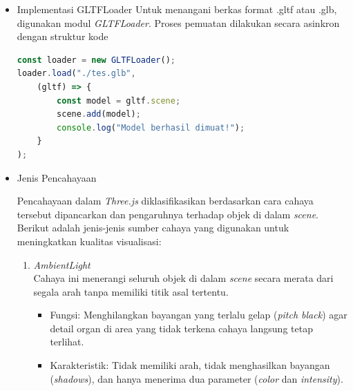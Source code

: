 \documentclass[a4paper,twoside]{article}
\begin{document}
\begin{enumerate}
\begin{itemize}
                    Proses integrasi aset visual ke dalam sistem dilakukan dengan memuat model eksternal menggunakan \textit{loader} spesifik. Berdasarkan standar dokumentasi \textit{Three.\-js} \footnote{\url{https://threejs.org/manual/#en/loading-3d-models} (diakses pada 1 April 2026)}, format yang paling disarankan untuk keperluan web adalah \textit{GLTF} (\textit{Graphics Language Transmission Format}) karena efisiensinya dalam pengiriman data melalui jaringan.
            
                \item{Implementasi GLTFLoader}
                    Untuk menangani berkas format .gltf atau .glb, digunakan modul \textit{GLTFLoader}. Proses pemuatan dilakukan secara asinkron dengan struktur kode 
                    
                    \begin{lstlisting}[language=JavaScript, caption={Implementasi Pemuatan Model GLTF}]
const loader = new GLTFLoader();
loader.load("./tes.glb", 
    (gltf) => {
        const model = gltf.scene;
        scene.add(model);
        console.log("Model berhasil dimuat!");
    }
);
                    \end{lstlisting}
                    
                \item{Jenis Pencahayaan}
                 \label{subsec:jenis_cahaya}
            
                    Pencahayaan dalam \textit{Three.js} diklasifikasikan berdasarkan cara cahaya tersebut dipancarkan dan pengaruhnya terhadap objek di dalam \textit{scene}. Berikut adalah jenis-jenis sumber cahaya yang digunakan untuk meningkatkan kualitas visualisasi:
            
                    \begin{enumerate}
                        \item \textit{AmbientLight} \\
                        Cahaya ini menerangi seluruh objek di dalam \textit{scene} secara merata dari segala arah tanpa memiliki titik asal tertentu.
                        \begin{itemize}
                            \item Fungsi: Menghilangkan bayangan yang terlalu gelap (\textit{pitch black}) agar detail organ di area yang tidak terkena cahaya langsung tetap terlihat.
                            \item Karakteristik: Tidak memiliki arah, tidak menghasilkan bayangan (\textit{shadows}), dan hanya menerima dua parameter (\textit{color} dan \textit{intensity}).
                        \end{itemize}
                    

\end{enumerate}
\end{itemize}
\end{enumerate}
\end{document}
